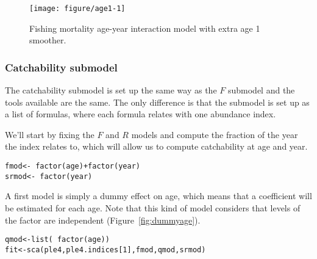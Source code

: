 \documentclass[a4paper,english,10pt]{article}\usepackage[]{graphicx}\usepackage[]{color}
\makeatletter
\def\maxwidth{ %
  \ifdim\Gin@nat@width>\linewidth
    \linewidth
  \else
    \Gin@nat@width
  \fi
}
\newcommand{\hlnum}[1]{\textcolor[rgb]{0.2,0.2,0.2}{#1}}%
\newcommand{\hlopt}[1]{\textcolor[rgb]{0.2,0.2,0.2}{#1}}%
\newcommand{\hlstd}[1]{\textcolor[rgb]{0,0,0}{#1}}%
\newcommand{\hlkwb}[1]{\textcolor[rgb]{0.361,0.506,0.596}{#1}}%
\newcommand{\hlkwd}[1]{\textcolor[rgb]{0.361,0.506,0.596}{#1}}%
\newenvironment{kframe}{%
 \def\at@end@of@kframe{}%
 \ifinner\ifhmode%
  \def\at@end@of@kframe{\end{minipage}}%
  \begin{minipage}{\columnwidth}%
 \fi\fi%
 \def\FrameCommand##1{\hskip\@totalleftmargin \hskip-\fboxsep
 \colorbox{shadecolor}{##1}\hskip-\fboxsep
     \hskip-\linewidth \hskip-\@totalleftmargin \hskip\columnwidth}%
 \MakeFramed {\advance\hsize-\width
   \@totalleftmargin\z@ \linewidth\hsize
   \@setminipage}}%
 {\par\unskip\endMakeFramed%
 \at@end@of@kframe}
\newenvironment{knitrout}{}{} %
\makeatother
\begin{document}
\begin{knitrout}
\color{fgcolor}\begin{figure}[H]

{\centering \texttt{[image: figure/age1-1]} 

}

\caption[Fishing mortality age-year interaction model with extra age 1 smoother]{Fishing mortality age-year interaction model with extra age 1 smoother.\label{fig:age1}}
\end{figure}


\end{knitrout}

\subsubsection{Catchability submodel}

The catchability submodel is set up the same way as the $F$ submodel and the tools available are the same. The only difference is that the submodel is set up as a list of formulas, where each formula relates with one abundance index.

We'll start by fixing the $F$ and $R$ models and compute the fraction of the year the index relates to, which will allow us to compute catchability at age and year. 

\begin{knitrout}
\color{fgcolor}\begin{kframe}
\begin{alltt}
\hlstd{fmod} \hlkwb{<-} \hlopt{~} \hlkwd{factor}\hlstd{(age)} \hlopt{+} \hlkwd{factor}\hlstd{(year)}
\hlstd{srmod} \hlkwb{<-} \hlopt{~} \hlkwd{factor}\hlstd{(year)}
\end{alltt}
\end{kframe}
\end{knitrout}

A first model is simply a dummy effect on age, which means that a coefficient will be estimated for each age. Note that this kind of model considers that levels of the factor are independent (Figure~\ref{fig:dummyage}).

\begin{knitrout}
\color{fgcolor}\begin{kframe}
\begin{alltt}
\hlstd{qmod} \hlkwb{<-} \hlkwd{list}\hlstd{(}\hlopt{~} \hlkwd{factor}\hlstd{(age))}
\hlstd{fit} \hlkwb{<-} \hlkwd{sca}\hlstd{(ple4, ple4.indices[}\hlnum{1}\hlstd{], fmod, qmod, srmod)}
\end{alltt}
\end{kframe}
\end{knitrout}
\end{document}
